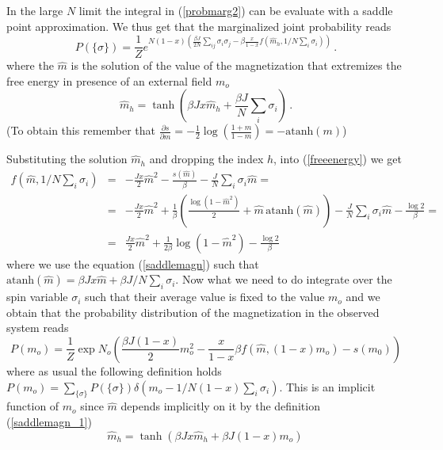 \documentclass[aps,pre,noshowpacs]{revtex4}
\begin{document}
In the large $N$ limit the integral in (\ref{probmarg2}) can be evaluate with a saddle point approximation. 
We thus get that the marginalized joint probability reads
\begin{equation}\label{probmarginal}
P(\{\sigma\}) = \frac{1}{Z}e^{N (1-x) \left(\frac{ \beta J }{2 N } \sum_{i j}\sigma_i \sigma_j - \beta \frac{x}{1-x} f(\hat{m}_h,1/N \sum_i \sigma_i)\right)}\,. 
\end{equation}
where the $\hat{m}$ is the solution of the value of the magnetization that extremizes the free energy 
in presence of an external field $m_o$
\begin{equation} \label{saddlemagn_1}
\hat{m}_h=\tanh(\beta J x \hat{m}_h +  \frac{\beta J}{N}  \sum_i \sigma_i)\,.
\end{equation}
(To obtain this  remember that $\frac{\partial s}{\partial m}= - \frac{1}{2} \log\left(\frac{1+m}{1-m}\right)=-\mbox{atanh}(m)$)

Substituting the solution $\hat{m}_h$ and dropping the index $h$, into (\ref{freeenergy}) we get
\begin{eqnarray}\label{fenergy_mhat}
f(\hat{m},1/N\sum_i\sigma_i)&=& -\frac{J x}{2 } \hat{m}^2 - \frac{ s(\hat{m})}{\beta} - \frac{J}{N}  \sum_i\sigma_i \hat{m} =\nonumber\\
&=&-\frac{J x}{2} \hat{m}^2 +  \frac{1}{\beta} \left(\frac{ \log(1-\hat{m}^2) }{2}+\hat{m}\, \mbox{atanh}(\hat{m})\right) - \frac{J}{N}\sum_i\sigma_i   \hat{m} - \frac{\log 2}{\beta}=\nonumber\\
&=&\frac{J x}{2} \hat{m}^2 +  \frac{1}{2\beta } \log(1-\hat{m}^2)- \frac{\log 2}{\beta}
\end{eqnarray}
where we use the equation (\ref{saddlemagn}) such that $\mbox{atanh}(\hat{m})=\beta J x \hat{m} + \beta J/N \sum_i\sigma_i$. 
Now what we need to do integrate over the spin variable $\sigma_i$ such that their average value is fixed to the value $m_o$ and we obtain that
the probability distribution of the magnetization in the observed system reads
\begin{equation}\label{prob_finale}
P(m_o) =  \frac{1}{Z}\exp N_o \left(\frac{ \beta J (1-x) }{2}m_o^2 - \frac{x}{1-x} \beta f(\hat{m},(1-x) m_o) - s(m_0) \right)
\end{equation}
where as usual the following definition holds $P(m_o)=\sum_{\{\sigma\}} P(\{\sigma\}) \delta(m_o-1/N(1-x)\sum_i \sigma_i)$. 
This is an implicit function of $m_o$ since $\hat{m}$ depends implicitly on it by the definition (\ref{saddlemagn_1}) 
\begin{equation}\label{saddlemagn}
\hat{m}_h=\tanh(\beta J x \hat{m}_h +  \beta J (1-x) m_o)\,
\end{equation}
\end{document}
